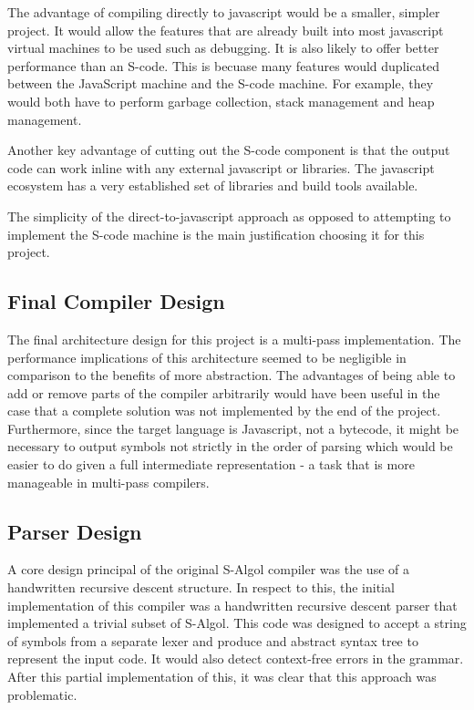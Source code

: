 \documentclass{article}
\begin{document}
The advantage of compiling directly to javascript would be a smaller, simpler project. It would allow the features that are already built into most javascript virtual machines to be used such as debugging. It is also likely to offer better performance than an S-code. This is becuase many features would duplicated between the JavaScript machine and the S-code machine. For example, they would both have to perform garbage collection, stack management and heap management.

Another key advantage of cutting out the S-code component is that the output code can work inline with any external javascript or libraries. The javascript ecosystem has a very established set of libraries and build tools available. 

The simplicity of the direct-to-javascript approach as opposed to attempting to implement the S-code machine is the main justification choosing it for this project.

\subsection{Final Compiler Design}

The final architecture design for this project is a multi-pass implementation. The performance implications of this architecture seemed to be negligible in comparison to the benefits of more abstraction. The advantages of being able to add or remove parts of the compiler arbitrarily would have been useful in the case that a complete solution was not implemented by the end of the project. Furthermore, since the target language is Javascript, not a bytecode, it might be necessary to output symbols not strictly in the order of parsing which would be easier to do given a full intermediate representation - a task that is more manageable in multi-pass compilers.

\subsection{Parser Design}

A core design principal of the original S-Algol compiler was the use of a handwritten recursive descent structure. In respect to this, the initial implementation of this compiler was a handwritten recursive descent parser that implemented a trivial subset of S-Algol. This code was designed to accept a string of symbols from a separate lexer and produce and abstract syntax tree to represent the input code. It would also detect context-free errors in the grammar. After this partial implementation of this, it was clear that this approach was problematic.
\end{document}

